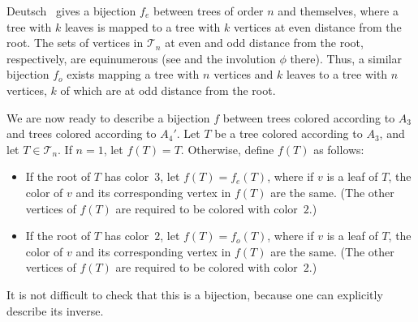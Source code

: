 \documentclass[12pt]{amsart}
\begin{document}
\begin{description}
    Deutsch~\cite{Deutsch2000bijection} gives a bijection $f_e$ between trees of order $n$ and themselves, where a tree with $k$ leaves is mapped to a tree with $k$ vertices at even distance from the root. The sets of vertices in $\mathcal{T}_{n}$ at even and odd distance from the root, respectively, are equinumerous (see \cite[Corollary 4.3]{CLS2007Butterfly} and the involution $\phi$ there). Thus, a similar bijection $f_o$ exists mapping a tree with $n$ vertices and $k$ leaves to a tree with $n$ vertices, $k$ of which are at odd distance from the root. 
    
    We are now ready to describe a bijection $f$ between trees colored according to $A_{3}$ and trees colored according to $A_{4}'$. Let $T$ be a tree colored according to $A_3$, and let $T\in\mathcal{T}_n$. If $n=1$, let $f(T)=T$. Otherwise, define $f(T)$ as follows:
    \begin{itemize}
        \item If the root of $T$ has color~$3$, let $f(T) = f_e(T)$, where if $v$ is a leaf of $T$, the color of $v$ and its corresponding vertex in $f(T)$ are the same. (The other vertices of $f(T)$ are required to be colored with color~$2$.)
        \item If the root of $T$ has color~$2$, let $f(T) = f_o(T)$, where if $v$ is a leaf of $T$, the color of $v$ and its corresponding vertex in $f(T)$ are the same. (The other vertices of $f(T)$ are required to be colored with color~$2$.)
    \end{itemize}
    It is not difficult to check that this is a bijection, because one can explicitly describe its inverse.

\end{description}
\end{document}
